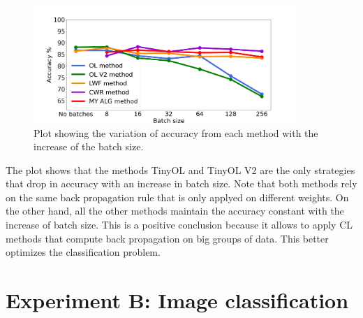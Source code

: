 \documentclass[12pt]{report}
\begin{document}
\begin{figure}[h!]
    \centering
    \includegraphics[width=100mm]{Figures/Chapter5/batch_size_letters.png} 
    \caption{Plot showing the variation of accuracy from each method with the increase of the batch size.}
    \label{fig:batch_size_letter}    
\end{figure}

The plot shows that the methods TinyOL and TinyOL V2 are the only strategies that drop in accuracy with an increase in batch size. Note that both methods rely on the same back propagation rule that is only applyed on different weights. On the other hand, all the other methods maintain the accuracy constant with the increase of batch size. This is a positive conclusion because it allows to apply CL methods that compute back propagation on big groups of data. This better optimizes the classification problem.

\section{Experiment B: Image classification}
\end{document}
